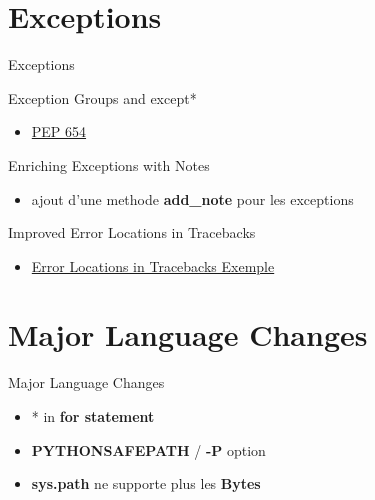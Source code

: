 \documentclass[aspectratio=169, xetex, 12pt]{beamer}
\begin{document}
    \section{Exceptions}
    \begin{frame}{Exceptions}
        \begin{block}{Exception Groups and except*}
            \begin{itemize}
                \item \href{https://peps.python.org/pep-0654/}{PEP 654}
            \end{itemize}
        \end{block}
        \begin{block}{Enriching Exceptions with Notes}
            \begin{itemize}
                \item ajout d'une methode \textbf{add\_note} pour les exceptions
            \end{itemize}
        \end{block}
        \begin{block}{Improved Error Locations in Tracebacks}
            \begin{itemize}
                \item \href{https://docs.python.org/3.11/whatsnew/3.11.html\#enhanced-error-locations-in-tracebacks}{Error Locations in Tracebacks Exemple}
            \end{itemize}
        \end{block}
    \end{frame}

    \section{Major Language Changes}
    \begin{frame}{Major Language Changes}
        \begin{block}{}
            \begin{itemize}
                \item * in \textbf{for statement}
                \item \textbf{PYTHONSAFEPATH} / \textbf{-P} option
                \item \textbf{sys.path} ne supporte plus les \textbf{Bytes}
            \end{itemize}
        \end{block}
    \end{frame}
\end{document}
